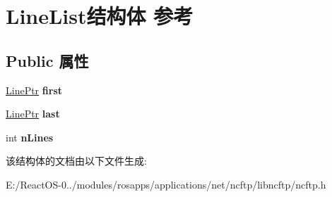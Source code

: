\hypertarget{struct_line_list}{}\section{Line\+List结构体 参考}
\label{struct_line_list}
\subsection*{Public 属性}
\begin{DoxyCompactItemize}
\item 
\mbox{\label{struct_line_list_a18eaf1f3aef3487251de51e30f0294ed}} 
\hyperlink{struct_line}{Line\+Ptr} {\bfseries first}
\item 
\mbox{\label{struct_line_list_a9fba11c8c2ff03a35f89a3b2344ada1d}} 
\hyperlink{struct_line}{Line\+Ptr} {\bfseries last}
\item 
\mbox{\label{struct_line_list_a061d89fdc52bf2b087d76f62b753bfd6}} 
int {\bfseries n\+Lines}
\end{DoxyCompactItemize}


该结构体的文档由以下文件生成\+:\begin{DoxyCompactItemize}
\item 
E\+:/\+React\+O\+S-\/0../modules/rosapps/applications/net/ncftp/libncftp/ncftp.\+h\end{DoxyCompactItemize}
